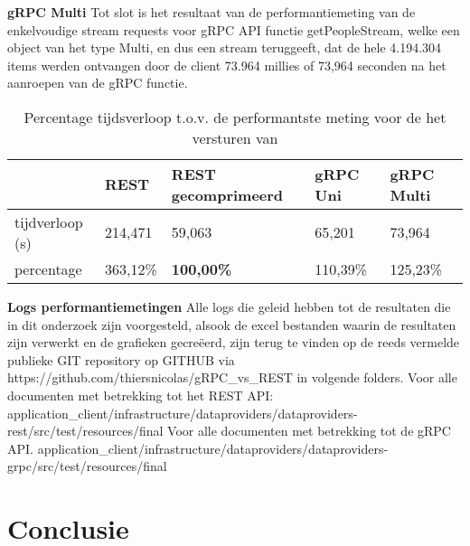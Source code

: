 \textbf{gRPC Multi}\newline
Tot slot is het resultaat van de performantiemeting van de enkelvoudige stream requests voor gRPC API functie getPeopleStream,
welke een object van het type Multi, en dus een stream teruggeeft, dat de hele 4.194.304 items werden ontvangen door de client 73.964 millies of 73,964 seconden
na het aanroepen van de gRPC functie.\\

\begin{table}
    \centering
    \begin{tabular}{lllll}
        \toprule
        \textbf{} & \textbf{REST} & \textbf{REST gecomprimeerd} & \textbf{gRPC Uni} & \textbf{gRPC Multi} \\
        \midrule
        tijdverloop (s) & 214,471 & 59,063 & 65,201 & 73,964 \\
        percentage & 363,12\% & \textbf{100,00\%} & 110,39\% & 125,23\% \\
        \bottomrule
    \end{tabular}
    \caption{Percentage tijdsverloop t.o.v. de performantste meting voor de het versturen van }
    \label{tab:REST_RESTgecomprimeerd_gRPCUni_gRPCmultimeervoudig}
\end{table}


\textbf{Logs performantiemetingen}\newline
Alle logs die geleid hebben tot de resultaten die in dit onderzoek zijn voorgesteld, alsook de excel bestanden waarin de resultaten zijn verwerkt en de grafieken gecre\"eerd,
zijn terug te vinden op de reeds vermelde publieke GIT repository op GITHUB via https://github.com/thiersnicolas/gRPC\_vs\_REST in volgende folders.\newline
Voor alle documenten met betrekking tot het REST API:\newline
application\_client/infrastructure/dataproviders/dataproviders-rest/src/test/resources/final\newline
Voor alle documenten met betrekking tot de gRPC API.\newline
application\_client/infrastructure/dataproviders/dataproviders-grpc/src/test/resources/final\\

\section{Conclusie}

